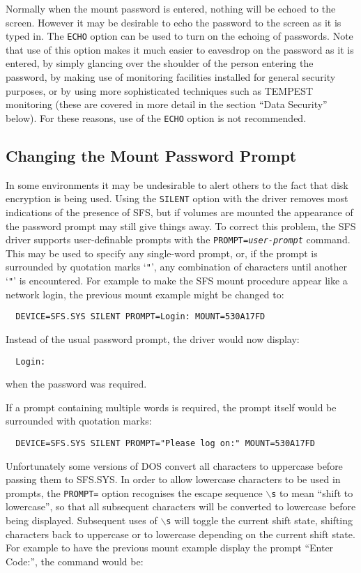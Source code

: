 Normally when the mount password is entered, nothing will be echoed to the
screen.  However it may be desirable to echo the password to the screen as it
is typed in.  The {\tt ECHO} option can be used to turn on the echoing of
passwords. Note that use of this option makes it much easier to eavesdrop on
the password as it is entered, by simply glancing over the shoulder of the
person entering the password, by making use of monitoring facilities installed
for general security purposes, or by using more sophisticated techniques such
as TEMPEST monitoring (these are covered in more detail in the section ``Data
Security'' below).  For these reasons, use of the {\tt ECHO} option is not
recommended.


\subsection{Changing the Mount Password Prompt}

In some environments it may be undesirable to alert others to the fact that
disk encryption is being used.  Using the {\tt SILENT} option with the driver
removes most indications of the presence of SFS, but if volumes are mounted the 
appearance of the password prompt may still give things away.  To correct this 
problem, the SFS driver supports user-definable prompts with the
{\tt PROMPT={\em user-prompt}} command.  This may be used to specify any single-word
prompt, or, if the prompt is surrounded by quotation marks `{\tt "}', any combination
of characters until another `{\tt "}' is encountered.  For example to make the SFS
mount procedure appear like a network login, the previous mount example might 
be changed to:

{\tt \verb|  |DEVICE=SFS.SYS SILENT PROMPT=Login: MOUNT=530A17FD}

Instead of the usual password prompt, the driver would now display:

{\tt \verb|  |Login:}

when the password was required.

If a prompt containing multiple words is required, the prompt itself would be
surrounded with quotation marks:

{\tt \verb|  |DEVICE=SFS.SYS SILENT PROMPT="Please log on:" MOUNT=530A17FD}

Unfortunately some versions of DOS convert all characters to uppercase before
passing them to SFS.SYS.  In order to allow lowercase characters to be used in
prompts, the {\tt PROMPT=} option recognises the escape sequence {\tt $\backslash$s} to mean
``shift to lowercase'', so that all subsequent characters will be converted to
lowercase before being displayed.  Subsequent uses of {\tt $\backslash$s} will toggle the
current shift state, shifting characters back to uppercase or to lowercase
depending on the current shift state.  For example to have the previous
mount example display the prompt ``Enter Code:'', the command would be:

